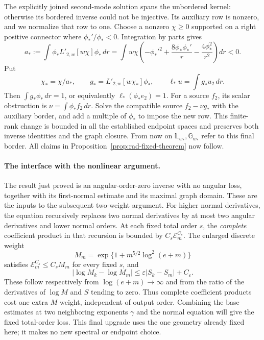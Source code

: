 The explicitly joined second-mode solution spans the unbordered kernel:
otherwise its bordered inverse could not be injective.  Its auxiliary
row is nonzero, and we normalize that row to one.
Choose a nonzero $\chi\ge0$ supported on a right positive connector
where $\phi_*'/\phi_*<0$.  Integration by parts gives
\begin{equation}\label{eq:ct-positive-shape}
 a_*:=\int\phi_*L'_{2,w}[w\chi]\phi_*\,dr
 =\int w\chi\left(-\phi_*'^2+\frac{8\phi_*\phi_*'}r
                              -\frac{4\phi_*^2}{r^2}\right)dr<0.
\end{equation}
Put
\begin{equation}\label{eq:rad-eq-ct9}
 \chi_*=\chi/a_*,\qquad
 g_*=L'_{2,w}[w\chi_*]\phi_*,\qquad
 \ell_*u=\int g_*u_2\,dr.
\end{equation}
Then $\int g_*\phi_*\,dr=1$, or equivalently $\ell_*(\phi_*e_2)=1$.
For a source $f_2$, its scalar obstruction is
$\nu=\int\phi_*f_2\,dr$.
Solve the compatible source $f_2-\nu g_*$ with the auxiliary border,
and add a multiple of $\phi_*$ to impose the new row.  This finite-rank
change is bounded in all the established endpoint spaces and preserves
both inverse identities and the graph closure.  From now on
$\mathbb L_{w_*},\mathbb G_{w_*}$ refer to this final border.
All claims in Proposition~\ref{prop:rad-fixed-theorem} now follow.

\paragraph{The interface with the nonlinear argument.}
The result just proved is an angular-order-zero inverse with no angular
loss, together with its first-normal estimate and its maximal graph
domain.  These are the inputs to the subsequent two-weight argument.
For higher normal derivatives, the equation recursively replaces two
normal derivatives by at most two angular derivatives and lower normal
orders.  At each fixed total order $s$, the \emph{complete} coefficient
product in that recursion is bounded by $C_s\mathcal E_m^{C_s}$.
The enlarged discrete weight
\[
 M_m=\exp\{1+m^{5/2}\log^2(e+m)\}
\]
satisfies $\mathcal E_m^{C_s}\le C_sM_m$ for every fixed $s$, and
\[
 |\log M_k-\log M_m|
       \le\varepsilon|S_k-S_m|+C_\varepsilon.
\]
These follow respectively from $\log(e+m)\to\infty$ and from the
ratio of the derivatives of $\log M$ and $S$ tending to zero.
Thus complete coefficient products cost one extra $M$ weight,
independent of output order.  Combining the base estimates at two
neighboring exponents $\gamma$ and the normal equation will give the
fixed total-order loss.  This final upgrade uses the one geometry
already fixed here; it makes no new spectral or endpoint choice.
